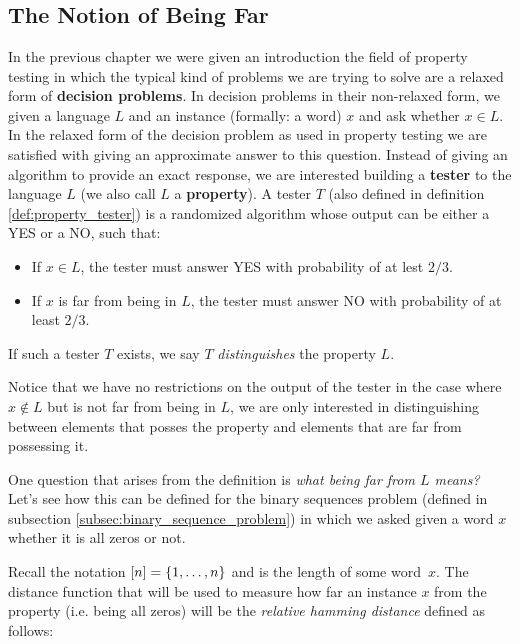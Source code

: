 \chapter{}

\section{The Notion of Being Far}
In the previous chapter we were given an introduction the field of property testing in which the typical kind of problems we are trying to solve are a relaxed form of \textbf{decision problems}.
In decision problems in their non-relaxed form, we given a language \(L\) and an instance (formally: a word) \(x\) and ask whether \(x \in L\).
In the relaxed form of the decision problem as used in property testing we are satisfied with giving an approximate answer to this question.
Instead of giving an algorithm to provide an exact response, we are interested building a \textbf{tester} to the language \(L\) (we also call \(L\) a \textbf{property}).
A tester \(T\) (also defined in definition \ref{def:property_tester}) is a randomized algorithm whose output can be either a YES or a NO, such that:

\begin{itemize}
    \item If \(x\in L\), the tester must answer YES with probability of at lest \(2/3\).
    \item If \(x\) is far from being in \(L\), the tester must answer NO with probability of at least \(2/3\).
\end{itemize}
If such a tester \(T\) exists, we say \(T\) \emph{distinguishes} the property \(L\).

Notice that we have no restrictions on the output of the tester in the case where \(x\not \in L\) but is not far from being in \(L\), we are only interested in distinguishing between elements that posses the property and elements that are far from possessing it.

One question that arises from the definition is \emph{what being far from \(L\) means?}
Let's see how this can be defined for the binary sequences problem (defined in subsection \ref{subsec:binary_sequence_problem}) in which we asked given a word \(x\) whether it is all zeros or not.

Recall the notation \(\left[n\right] = \left\{1,\ldots,n\right\}\) and  is the length of some word~\(x\). The distance function that will be used to measure how far an instance \(x\) from the property (i.e. being all zeros) will be the \emph{relative hamming distance} defined as follows:

